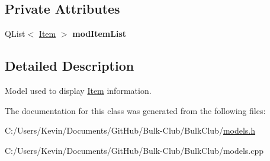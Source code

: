 \subsection*{Private Attributes}
\begin{DoxyCompactItemize}
\item 
\mbox{\label{class_item_model_ad6380d5a1a6268a82ff22cda344f12ec}} 
Q\+List$<$ \mbox{\hyperlink{class_item}{Item}} $>$ {\bfseries mod\+Item\+List}
\end{DoxyCompactItemize}


\subsection{Detailed Description}
Model used to display \mbox{\hyperlink{class_item}{Item}} information. 

The documentation for this class was generated from the following files\+:\begin{DoxyCompactItemize}
\item 
C\+:/\+Users/\+Kevin/\+Documents/\+Git\+Hub/\+Bulk-\/\+Club/\+Bulk\+Club/\mbox{\hyperlink{models_8h}{models.\+h}}\item 
C\+:/\+Users/\+Kevin/\+Documents/\+Git\+Hub/\+Bulk-\/\+Club/\+Bulk\+Club/models.\+cpp\end{DoxyCompactItemize}
